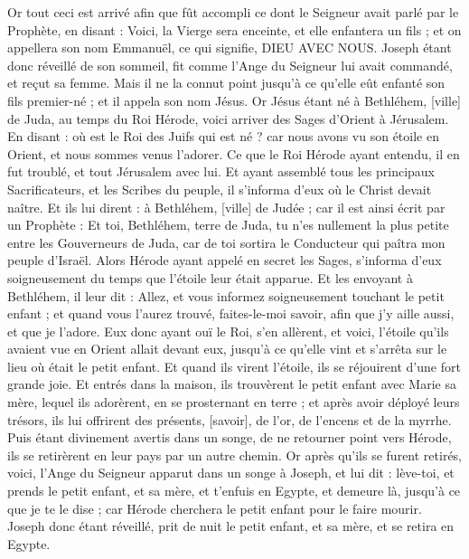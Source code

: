 \begin{multicols}{2}
Or tout ceci est arrivé afin que fût accompli ce dont le Seigneur avait parlé par le Prophète, en disant :
Voici, la Vierge sera enceinte, et elle enfantera un fils ; et on appellera son nom Emmanuël, ce qui signifie, DIEU AVEC NOUS.
Joseph étant donc réveillé de son sommeil, fit comme l'Ange du Seigneur lui avait commandé, et reçut sa femme.
Mais il ne la connut point jusqu'à ce qu'elle eût enfanté son fils premier-né ; et il appela son nom Jésus.
\VerseOne{}Or Jésus étant né à Bethléhem, [ville] de Juda, au temps du Roi Hérode, voici arriver des Sages d'Orient à Jérusalem.
En disant : où est le Roi des Juifs qui est né ? car nous avons vu son étoile en Orient, et nous sommes venus l'adorer.
Ce que le Roi Hérode ayant entendu, il en fut troublé, et tout Jérusalem avec lui.
Et ayant assemblé tous les principaux Sacrificateurs, et les Scribes du peuple, il s'informa d'eux où le Christ devait naître.
Et ils lui dirent : à Bethléhem, [ville] de Judée ; car il est ainsi écrit par un Prophète :
Et toi, Bethléhem, terre de Juda, tu n'es nullement la plus petite entre les Gouverneurs de Juda, car de toi sortira le Conducteur qui paîtra mon peuple d'Israël.
Alors Hérode ayant appelé en secret les Sages, s'informa d'eux soigneusement du temps que l'étoile leur était apparue.
Et les envoyant à Bethléhem, il leur dit : Allez, et vous informez soigneusement touchant le petit enfant ; et quand vous l'aurez trouvé, faites-le-moi savoir, afin que j'y aille aussi, et que je l'adore.
Eux donc ayant ouï le Roi, s'en allèrent, et voici, l'étoile qu'ils avaient vue en Orient allait devant eux, jusqu'à ce qu'elle vint et s'arrêta sur le lieu où était le petit enfant.
Et quand ils virent l'étoile, ils se réjouirent d'une fort grande joie.
Et entrés dans la maison, ils trouvèrent le petit enfant avec Marie sa mère, lequel ils adorèrent, en se prosternant en terre ; et après avoir déployé leurs trésors, ils lui offrirent des présents, [savoir], de l'or, de l'encens et de la myrrhe.
Puis étant divinement avertis dans un songe, de ne retourner point vers Hérode, ils se retirèrent en leur pays par un autre chemin.
Or après qu'ils se furent retirés, voici, l'Ange du Seigneur apparut dans un songe à Joseph, et lui dit : lève-toi, et prends le petit enfant, et sa mère, et t'enfuis en Egypte, et demeure là, jusqu'à ce que je te le dise ; car Hérode cherchera le petit enfant pour le faire mourir.
Joseph donc étant réveillé, prit de nuit le petit enfant, et sa mère, et se retira en Egypte.

\end{multicols}
